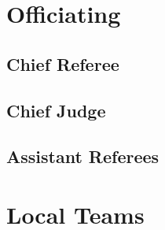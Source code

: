 \section{Officiating}

\subsection{Chief Referee}
\label{role:chief_ref}

\subsection{Chief Judge}
\label{role:chief_judge}

\subsection{Assistant Referees}
\label{role:assistant_refs}

\section{Local Teams}
\label{role:local_teams}

